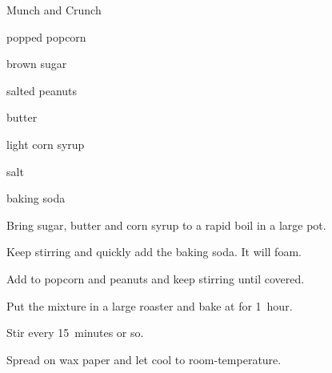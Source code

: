 \begin{recipe}{Munch and Crunch}{}{}

\begin{ingredients}
\item {} popped popcorn
\item {} brown sugar
\item \C{1 \half} salted peanuts
\item {} butter
\item \C{\half} light corn syrup
\item {} salt
\item \tp{\half} baking soda
\end{ingredients}

\begin{directions}
\item Bring sugar, butter and corn syrup to a rapid boil in a large pot.
\item Keep stirring and quickly add the baking soda. It will foam.
\item Add to popcorn and peanuts and keep stirring until covered.
\item Put the mixture in a large roaster and bake at  for 1~hour.
\item Stir every 15~minutes or so.
\item Spread on wax paper and let cool to room-temperature.
\end{directions}
\end{recipe}
